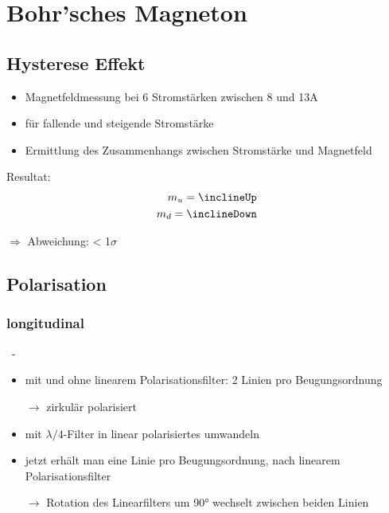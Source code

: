 
\section{Bohr'sches Magneton}
  \subsection{Hysterese Effekt}
    \begin{myframe}{\subsecname}
      \begin{itemize}
        \item Magnetfeldmessung bei 6 Stromstärken zwischen 8 und 13A
        \item für fallende und steigende Stromstärke
        \item Ermittlung des Zusammenhangs zwischen Stromstärke und Magnetfeld
      \end{itemize}

      Resultat:
      \begin{align}
        m_u = \inclineUp\\
        m_d = \inclineDown
      \end{align}

      $\Rightarrow$ Abweichung: < 1$\sigma$
    \end{myframe}


  \subsection{Polarisation}
    \subsubsection{longitudinal}
      \begin{myframe}{\subsecname\ - \subsubsecname}
        \begin{itemize}
          \item mit und ohne linearem Polarisationsfilter: 2 Linien pro Beugungsordnung
          \item[$\rightarrow$] zirkulär polarisiert
          \item[]
          \item mit $\lambda /4$-Filter in linear polarisiertes umwandeln
          \item jetzt erhält man eine Linie pro Beugungsordnung, nach linearem Polarisationsfilter
          \item[$\rightarrow$] Rotation des Linearfilters um 90° wechselt zwischen beiden Linien
        \end{itemize}
      \end{myframe}

